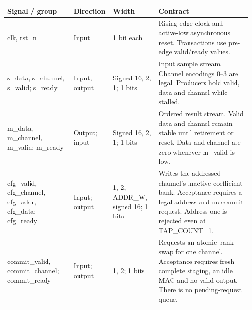 \documentclass[11pt,a4paper]{article}
\begin{document}
{\small\renewcommand{\arraystretch}{1.18}\begin{longtable}{@{}L{0.21\textwidth}|L{0.12\textwidth}|L{0.12\textwidth}|L{0.45\textwidth}@{}}\toprule

\textbf{Signal /\allowbreak{} group} & \textbf{Direction} & \textbf{Width} & \textbf{Contract}\\\midrule\endhead

clk,\allowbreak{} rst\_\allowbreak{}n & Input & 1 bit each & Rising-edge clock and active-low asynchronous reset. Transactions use pre-edge valid/\allowbreak{}ready values.\\[2pt]\hline

s\_\allowbreak{}data,\allowbreak{} s\_\allowbreak{}channel,\allowbreak{} s\_\allowbreak{}valid; s\_\allowbreak{}ready & Input; output & Signed 16,\allowbreak{} 2,\allowbreak{} 1; 1 bits & Input sample stream. Channel encodings 0–3 are legal. Producers hold valid,\allowbreak{} data and channel while stalled.\\[2pt]\hline

m\_\allowbreak{}data,\allowbreak{} m\_\allowbreak{}channel,\allowbreak{} m\_\allowbreak{}valid; m\_\allowbreak{}ready & Output; input & Signed 16,\allowbreak{} 2,\allowbreak{} 1; 1 bits & Ordered result stream. Valid data and channel remain stable until retirement or reset. Data and channel are zero whenever m\_\allowbreak{}valid is low.\\[2pt]\hline

cfg\_\allowbreak{}valid,\allowbreak{} cfg\_\allowbreak{}channel,\allowbreak{} cfg\_\allowbreak{}addr,\allowbreak{} cfg\_\allowbreak{}data; cfg\_\allowbreak{}ready & Input; output & 1,\allowbreak{} 2,\allowbreak{} ADDR\_\allowbreak{}W,\allowbreak{} signed 16; 1 bits & Writes the addressed channel's inactive coefficient bank. Acceptance requires a legal address and no commit request. Address one is rejected even at TAP\_\allowbreak{}COUNT=\allowbreak{}1.\\[2pt]\hline

commit\_\allowbreak{}valid,\allowbreak{} commit\_\allowbreak{}channel; commit\_\allowbreak{}ready & Input; output & 1,\allowbreak{} 2; 1 bits & Requests an atomic bank swap for one channel. Acceptance requires fresh complete staging,\allowbreak{} an idle MAC and no valid output. There is no pending-request queue.\\[2pt]\hline

\bottomrule\end{longtable}}
\end{document}
